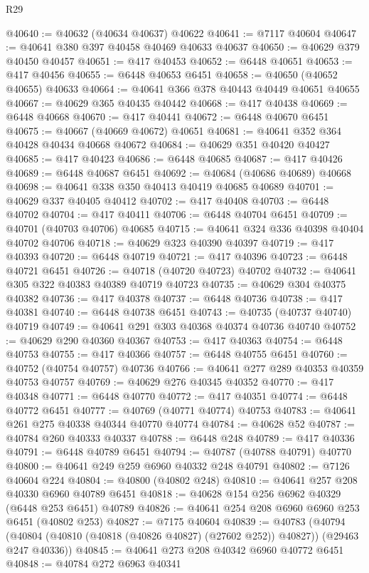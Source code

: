 \begin{lexlean}{R29}
\begin{coremodule}
@40640 := @40632 (@40634 @40637) @40622
@40641 := @7117 @40604
@40647 := @40641 @380 @397 @40458 @40469 @40633 @40637
@40650 := @40629 @379 @40450 @40457
@40651 := @417 @40453
@40652 := @6448 @40651
@40653 := @417 @40456
@40655 := @6448 @40653 @6451
@40658 := @40650 (@40652 @40655) @40633
@40664 := @40641 @366 @378 @40443 @40449 @40651 @40655
@40667 := @40629 @365 @40435 @40442
@40668 := @417 @40438
@40669 := @6448 @40668
@40670 := @417 @40441
@40672 := @6448 @40670 @6451
@40675 := @40667 (@40669 @40672) @40651
@40681 := @40641 @352 @364 @40428 @40434 @40668 @40672
@40684 := @40629 @351 @40420 @40427
@40685 := @417 @40423
@40686 := @6448 @40685
@40687 := @417 @40426
@40689 := @6448 @40687 @6451
@40692 := @40684 (@40686 @40689) @40668
@40698 := @40641 @338 @350 @40413 @40419 @40685 @40689
@40701 := @40629 @337 @40405 @40412
@40702 := @417 @40408
@40703 := @6448 @40702
@40704 := @417 @40411
@40706 := @6448 @40704 @6451
@40709 := @40701 (@40703 @40706) @40685
@40715 := @40641 @324 @336 @40398 @40404 @40702 @40706
@40718 := @40629 @323 @40390 @40397
@40719 := @417 @40393
@40720 := @6448 @40719
@40721 := @417 @40396
@40723 := @6448 @40721 @6451
@40726 := @40718 (@40720 @40723) @40702
@40732 := @40641 @305 @322 @40383 @40389 @40719 @40723
@40735 := @40629 @304 @40375 @40382
@40736 := @417 @40378
@40737 := @6448 @40736
@40738 := @417 @40381
@40740 := @6448 @40738 @6451
@40743 := @40735 (@40737 @40740) @40719
@40749 := @40641 @291 @303 @40368 @40374 @40736 @40740
@40752 := @40629 @290 @40360 @40367
@40753 := @417 @40363
@40754 := @6448 @40753
@40755 := @417 @40366
@40757 := @6448 @40755 @6451
@40760 := @40752 (@40754 @40757) @40736
@40766 := @40641 @277 @289 @40353 @40359 @40753 @40757
@40769 := @40629 @276 @40345 @40352
@40770 := @417 @40348
@40771 := @6448 @40770
@40772 := @417 @40351
@40774 := @6448 @40772 @6451
@40777 := @40769 (@40771 @40774) @40753
@40783 := @40641 @261 @275 @40338 @40344 @40770 @40774
@40784 := @40628 @52
@40787 := @40784 @260 @40333 @40337
@40788 := @6448 @248
@40789 := @417 @40336
@40791 := @6448 @40789 @6451
@40794 := @40787 (@40788 @40791) @40770
@40800 := @40641 @249 @259 @6960 @40332 @248 @40791
@40802 := @7126 @40604 @224
@40804 := @40800 (@40802 @248)
@40810 := @40641 @257 @208 @40330 @6960 @40789 @6451
@40818 := @40628 @154 @256 @6962 @40329 (@6448 @253 @6451) @40789
@40826 := @40641 @254 @208 @6960 @6960 @253 @6451 (@40802 @253)
@40827 := @7175 @40604
@40839 := @40783
    (@40794 (@40804 (@40810 (@40818 (@40826 @40827) (@27602 @252)) @40827)) (@29463 @247 @40336))
@40845 := @40641 @273 @208 @40342 @6960 @40772 @6451
@40848 := @40784 @272 @6963 @40341

\end{coremodule}
\end{lexlean}

